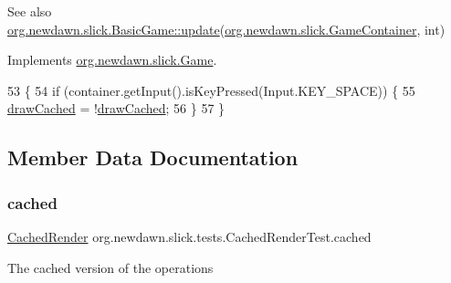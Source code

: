 \begin{DoxySeeAlso}{See also}
\mbox{\hyperlink{classorg_1_1newdawn_1_1slick_1_1_basic_game_acfe6fa05aef83bff1631af91a3e4bd20}{org.\+newdawn.\+slick.\+Basic\+Game\+::update}}(\mbox{\hyperlink{classorg_1_1newdawn_1_1slick_1_1_game_container}{org.\+newdawn.\+slick.\+Game\+Container}}, int) 
\end{DoxySeeAlso}


Implements \mbox{\hyperlink{interfaceorg_1_1newdawn_1_1slick_1_1_game_ab07b2e9463ee4631620dde0de25bdee8}{org.\+newdawn.\+slick.\+Game}}.


\begin{DoxyCode}
53                                                                                  \{
54         \textcolor{keywordflow}{if} (container.getInput().isKeyPressed(Input.KEY\_SPACE)) \{
55             \mbox{\hyperlink{classorg_1_1newdawn_1_1slick_1_1tests_1_1_cached_render_test_ab144e14912cdadf27a4bfcdb5379d49c}{drawCached}} = !\mbox{\hyperlink{classorg_1_1newdawn_1_1slick_1_1tests_1_1_cached_render_test_ab144e14912cdadf27a4bfcdb5379d49c}{drawCached}};
56         \}
57     \}
\end{DoxyCode}


\subsection{Member Data Documentation}
\mbox{\label{classorg_1_1newdawn_1_1slick_1_1tests_1_1_cached_render_test_a62630e9785f2d264aece45743623722a}} 
\subsubsection{\texorpdfstring{cached}{cached}}
{\footnotesize\ttfamily \mbox{\hyperlink{classorg_1_1newdawn_1_1slick_1_1_cached_render}{Cached\+Render}} org.\+newdawn.\+slick.\+tests.\+Cached\+Render\+Test.\+cached\hspace{0.3cm}{\ttfamily [private]}}

The cached version of the operations \mbox{\label{classorg_1_1newdawn_1_1slick_1_1tests_1_1_cached_render_test_ab144e14912cdadf27a4bfcdb5379d49c}} 
